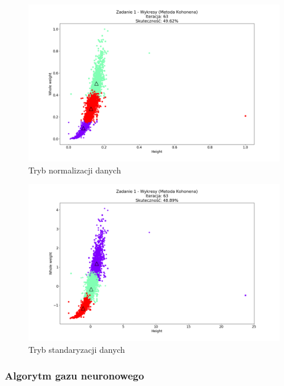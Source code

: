 \documentclass{classrep}
\begin{document}
{{{				\begin{figure}[!htbp]
					\centering
					\includegraphics[width=\textwidth,width=95mm]{wykresy/plot_kohonenAbaloneNormalised.png}
					\caption{Tryb normalizacji danych}
				\end{figure}
		
				\begin{figure}[!htbp]
					\centering
					\includegraphics[width=\textwidth,width=95mm]{wykresy/plot_kohonenAbaloneStandardised.png}
					\caption{Tryb standaryzacji danych}
				\end{figure}
			\FloatBarrier
		}

		\subsubsection{Algorytm gazu neuronowego}
		{

		}
	}
}
\end{document}
